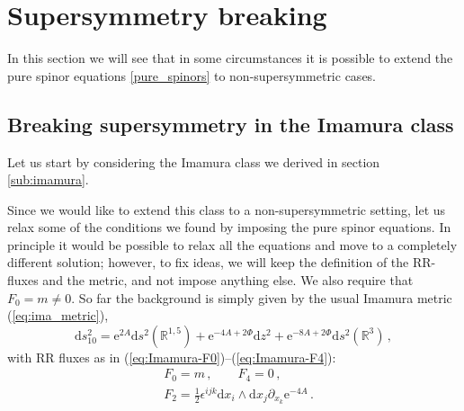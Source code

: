 \documentclass[12pt]{article}
\newcommand{\R}{\mathbb{R}}
\newcommand{\dd}{\mathrm{d}}
\newcommand{\e}{\mathrm{e}}
\begin{document}
\section{Supersymmetry breaking} \label{sec:susy-br}

In this section we will see that in some circumstances it is possible to extend the pure spinor equations \eqref{pure_spinors} to non-supersymmetric cases. 

\subsection{Breaking supersymmetry in the Imamura class} \label{sub:im-sb}

Let us start by considering the Imamura class we derived in section \ref{sub:imamura}. 

Since we would like to extend this class to a non-supersymmetric setting, let us relax some of the conditions we found by imposing the pure spinor equations. In principle it would be possible to relax all the equations and move to a completely different solution; however, to fix ideas, we will keep the definition of the RR-fluxes and the metric, and not impose anything else. We also require that $F_0 = m \neq 0$. So far the background is simply given by the usual Imamura metric (\ref{eq:ima_metric}),
\begin{equation}
\dd s^2_{10} = \e^{2A} \dd s^2 (\R^{1,5})+ \e^{-4A+2\Phi} \dd z^2+ \e^{-8A+2\Phi} \dd s^2(\R^3) \, ,
\end{equation}
with RR fluxes as in (\ref{eq:Imamura-F0})--(\ref{eq:Imamura-F4}):  
\begin{equation}
\label{eq:Ima-flux_repeat}
	\begin{split}
	&F_0 =m \, , \qquad F_4 = 0 \, ,\\
	&F_2 =  \frac{1}{2} \epsilon^{ijk} \dd x_i \wedge \dd x_j \partial_{x_k} \e^{-4A} \, . \\
	\end{split}
\end{equation}
\end{document}
